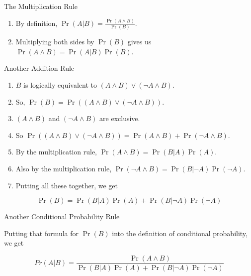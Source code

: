 \documentclass[
  ignorenonframetext,
]{beamer}
\providecommand{\tightlist}{%
  \setlength{\itemsep}{0pt}\setlength{\parskip}{0pt}}
\renewcommand{\,}{\text{, }}
\begin{document}
\begin{frame}{The Multiplication Rule}
\protect\hypertarget{the-multiplication-rule}{}

\begin{enumerate}
\tightlist
\item
  By definition, \(\Pr(A | B) = \frac{\Pr(A \wedge B)}{\Pr(B)}\). \pause
\item
  Multiplying both sides by \(\Pr(B)\) gives us
  \(\Pr(A \wedge B) = \Pr(A | B)\Pr(B)\).
\end{enumerate}

\end{frame}

\begin{frame}{Another Addition Rule}
\protect\hypertarget{another-addition-rule}{}

\begin{enumerate}
\tightlist
\item
  \(B\) is logically equivalent to
  \((A \wedge B) \vee (\neg A \wedge B)\). \pause
\item
  So, \(\Pr(B) = \Pr((A \wedge B) \vee (\neg A \wedge B))\). \pause
\item
  \((A \wedge B)\) and \((\neg A \wedge B)\) are exclusive. \pause
\item
  So
  \(\Pr((A \wedge B) \vee (\neg A \wedge B)) = \Pr(A \wedge B) + \Pr(\neg A \wedge B)\).
  \pause
\item
  By the multiplication rule, \(\Pr(A \wedge B) = \Pr(B | A)\Pr(A)\).
  \pause
\item
  Also by the multiplication rule,
  \(\Pr(\neg A \wedge B) = \Pr(B | \neg A)\Pr(\neg A)\). \pause
\item
  Putting all these together, we get
\end{enumerate}

\[
\Pr(B) = \Pr(B | A)\Pr(A) + \Pr(B | \neg A)\Pr(\neg A)
\]

\end{frame}

\begin{frame}{Another Conditional Probability Rule}
\protect\hypertarget{another-conditional-probability-rule}{}

Putting that formula for \(\Pr(B)\) into the definition of conditional
probability, we get

\[
Pr(A | B) = \frac{\Pr(A \wedge B)}{\Pr(B | A)\Pr(A) + \Pr(B | \neg A)\Pr(\neg A)}
\]

\end{frame}
\end{document}
